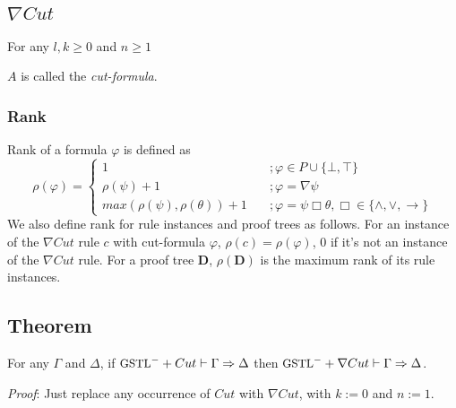 \subsection{$\nabla Cut$} For any $l,k \ge 0$ and $n \ge 1$
\begin{prooftree}
\end{prooftree}
$A$ is called the \textit{cut-formula}.

\subsubsection{Rank} Rank of a formula $\varphi$ is defined as
\[ \rho(\varphi) = \begin{cases}
1 & \quad ; \varphi \in P \cup \{ \bot, \top \} \\
\rho(\psi) + 1 & \quad ; \varphi = \nabla \psi \\
max(\rho(\psi), \rho(\theta)) + 1 & \quad ; \varphi = \psi \Box \theta, \Box \in \{ \land , \lor, \rightarrow \}
\end{cases} \]
We also define rank for rule instances and proof trees as follows. For an instance of the $\nabla Cut$ rule $c$ with cut-formula $\varphi$, $\rho(c) = \rho(\varphi)$, $0$ if it's not an instance of the $\nabla Cut$ rule.
For a proof tree $\mathbf{D}$, $\rho(\mathbf{D})$ is the maximum rank of its rule instances.

\subsection{Theorem} For any $\Gamma$ and $\Delta$, if $\small\text{GSTL}^- + Cut \vdash \Gamma \Rightarrow \Delta$ then $\small\text{GSTL}^- + \nabla Cut \vdash \Gamma \Rightarrow \Delta$.

\textit{Proof}: Just replace any occurrence of $Cut$ with $\nabla Cut$, with $k := 0$ and $n := 1$.
